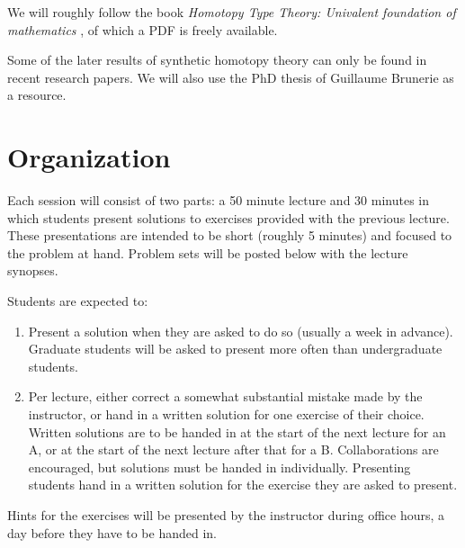 We will roughly follow the book \emph{Homotopy Type Theory: Univalent foundation of mathematics} \cite{hottbook}, of which a PDF is freely available.

Some of the later results of synthetic homotopy theory can only be found in recent research papers. We will also use the PhD thesis of Guillaume Brunerie \cite{BruneriePhD} as a resource.

\section{Organization}

Each session will consist of two parts: a 50 minute lecture and 30 minutes in which students present solutions to exercises provided with the previous lecture. These presentations are intended to be short (roughly 5 minutes) and focused to the problem at hand. Problem sets will be posted below with the lecture synopses.

Students are expected to:
\begin{enumerate}
\item Present a solution when they are asked to do so (usually a week in advance). Graduate students will be asked to present more often than undergraduate students.
\item Per lecture, either correct a somewhat substantial mistake made by the instructor, or hand in a written solution for one exercise of their choice. Written solutions are to be handed in at the start of the next lecture for an A, or at the start of the next lecture after that for a B. Collaborations are encouraged, but solutions must be handed in individually. Presenting students hand in a written solution for the exercise they are asked to present.
\end{enumerate}

Hints for the exercises will be presented by the instructor during office hours, a day before they have to be handed in. 
